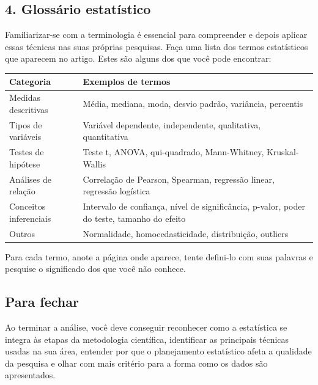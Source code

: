 \documentclass[
]{book}
\newcounter{none} %
\begin{document}
\subsection{4. Glossário estatístico}\label{glossuxe1rio-estatuxedstico}

Familiarizar-se com a terminologia é essencial para compreender e depois aplicar essas técnicas nas suas próprias pesquisas. Faça uma lista dos termos estatísticos que aparecem no artigo. Estes são alguns dos que você pode encontrar:

{\def\LTcaptype{none} %
\begin{longtable}[]{@{}
  >{\raggedright\arraybackslash}p{}
  >{\raggedright\arraybackslash}p{}@{}}
\toprule\noalign{}
\begin{minipage}[b]{\linewidth}\raggedright
Categoria
\end{minipage} & \begin{minipage}[b]{\linewidth}\raggedright
Exemplos de termos
\end{minipage} \\
\midrule\noalign{}
\endhead
\bottomrule\noalign{}
\endlastfoot
Medidas descritivas & Média, mediana, moda, desvio padrão, variância, percentis \\
Tipos de variáveis & Variável dependente, independente, qualitativa, quantitativa \\
Testes de hipótese & Teste t, ANOVA, qui-quadrado, Mann-Whitney, Kruskal-Wallis \\
Análises de relação & Correlação de Pearson, Spearman, regressão linear, regressão logística \\
Conceitos inferenciais & Intervalo de confiança, nível de significância, p-valor, poder do teste, tamanho do efeito \\
Outros & Normalidade, homocedasticidade, distribuição, outliers \\
\end{longtable}
}

Para cada termo, anote a página onde aparece, tente defini-lo com suas palavras e pesquise o significado dos que você não conhece.

\subsection{Para fechar}\label{para-fechar}

Ao terminar a análise, você deve conseguir reconhecer como a estatística se integra às etapas da metodologia científica, identificar as principais técnicas usadas na sua área, entender por que o planejamento estatístico afeta a qualidade da pesquisa e olhar com mais critério para a forma como os dados são apresentados.
\end{document}
